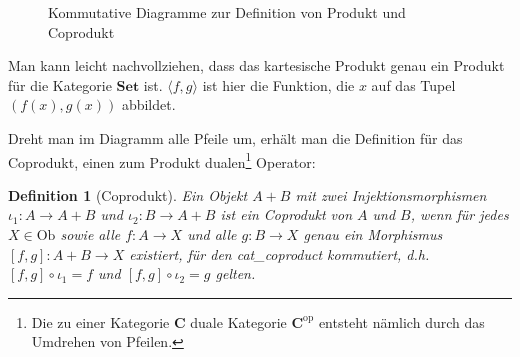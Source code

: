 \documentclass[a4paper, bibgerm]{book}
\newcommand\abb{}
\newcommand\ato{\rightarrow} %
\newtheorem{defini}{Definition}
\newcommand{\defi}[2]{%
  \begin{defini}[#1]
    \label{def:#1}
    #2
  \end{defini}
}
\begin{document}
\begin{figure}
  \centering
  \caption{Kommutative Diagramme zur Definition von Produkt und Coprodukt}
\end{figure}

Man kann leicht nachvollziehen, dass das kartesische Produkt genau ein
Produkt für die Kategorie $\mathbf{Set}$ ist. $\langle f,g \rangle$ ist
hier die Funktion, die $x$ auf das Tupel $(f(x), g(x))$ abbildet.

Dreht man im Diagramm alle Pfeile um, erhält man die Definition für das
Coprodukt, einen zum Produkt dualen\footnote{Die zu einer Kategorie
  $\mathbf{C}$ duale Kategorie $\mathbf{C}^{\mathrm{op}}$ entsteht
  nämlich durch das Umdrehen von Pfeilen.} Operator:

\defi{Coprodukt}{ Ein Objekt $A + B$ mit zwei Injektionsmorphismen
  $\iota_1 : A \ato A + B$ und $\iota_2 : B \ato A + B$ ist ein
  Coprodukt von $A$ und $B$, wenn für jedes $X \in \mathrm{Ob}$ sowie
  alle $f : A \ato X$ und alle $g : B \ato X$ genau ein Morphismus
  $[f,g] : A + B \ato X$ existiert, für den \abb{cat_coproduct}
  kommutiert, d.h.  $[f,g] \circ \iota_1 = f$ und $[f,g] \circ \iota_2 =
  g$ gelten.  }
\end{document}
